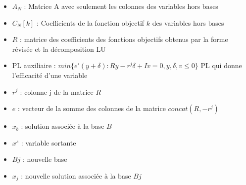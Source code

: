\documentclass[a4paper,10pt]{article}
\theoremstyle{plain}
\begin{document}
\begin{itemize}
\item $A_N$ : Matrice A avec seulement les colonnes des variables hors bases
\item $C_N[k]$ : Coefficients de la fonction objectif $k$ des variables hors bases
\item $R$ : matrice des coefficients des fonctions objectifs obtenus par la forme révisée et la décomposition LU
\item PL auxiliaire : $min \{ e'(y+\delta) : Ry - r^j\delta + Iv = 0,y,\delta,v \leq 0 \}$ PL qui donne l'efficacité d'une variable
\item $r^j$ : colonne j de la matrice $R$
\item $e$ : vecteur de la somme des colonnes de la matrice $concat(R,-r^j)$
\item $x_b$ : solution associée à la base $B$
\item $x^s$ : variable sortante
\item $Bj$ : nouvelle base
\item $x_j$ : nouvelle solution associée à la base $Bj$
\end{itemize}
\end{document}
